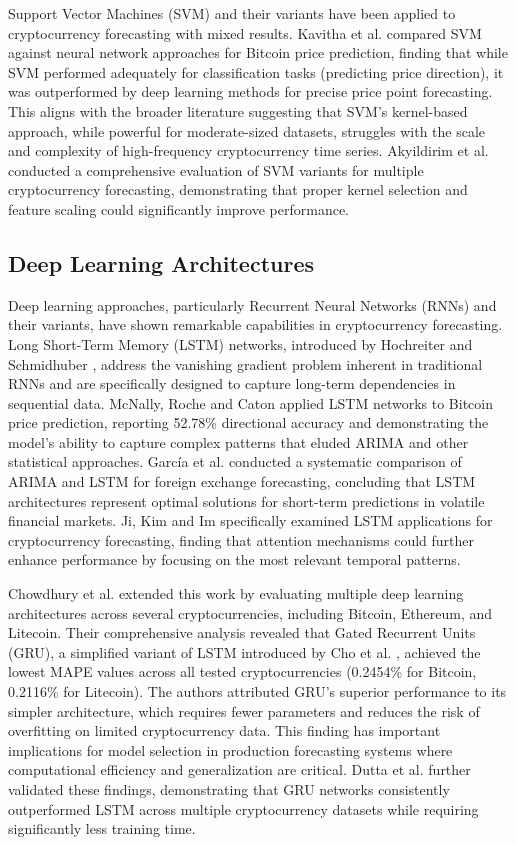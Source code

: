 \documentclass[conference]{IEEEtran}
\begin{document}
Support Vector Machines (SVM) and their variants have been applied to cryptocurrency forecasting with mixed results. Kavitha et al. \cite{kavitha2022} compared SVM against neural network approaches for Bitcoin price prediction, finding that while SVM performed adequately for classification tasks (predicting price direction), it was outperformed by deep learning methods for precise price point forecasting. This aligns with the broader literature suggesting that SVM's kernel-based approach, while powerful for moderate-sized datasets, struggles with the scale and complexity of high-frequency cryptocurrency time series. Akyildirim et al. \cite{akyildirim2021} conducted a comprehensive evaluation of SVM variants for multiple cryptocurrency forecasting, demonstrating that proper kernel selection and feature scaling could significantly improve performance.

\subsection{Deep Learning Architectures}

Deep learning approaches, particularly Recurrent Neural Networks (RNNs) and their variants, have shown remarkable capabilities in cryptocurrency forecasting. Long Short-Term Memory (LSTM) networks, introduced by Hochreiter and Schmidhuber \cite{hochreiter1997}, address the vanishing gradient problem inherent in traditional RNNs and are specifically designed to capture long-term dependencies in sequential data. McNally, Roche and Caton \cite{mcnally2018} applied LSTM networks to Bitcoin price prediction, reporting 52.78\% directional accuracy and demonstrating the model's ability to capture complex patterns that eluded ARIMA and other statistical approaches. Garc\'{i}a et al. \cite{garcia2023} conducted a systematic comparison of ARIMA and LSTM for foreign exchange forecasting, concluding that LSTM architectures represent optimal solutions for short-term predictions in volatile financial markets. Ji, Kim and Im \cite{ji2019} specifically examined LSTM applications for cryptocurrency forecasting, finding that attention mechanisms could further enhance performance by focusing on the most relevant temporal patterns.

Chowdhury et al. \cite{chowdhury2020} extended this work by evaluating multiple deep learning architectures across several cryptocurrencies, including Bitcoin, Ethereum, and Litecoin. Their comprehensive analysis revealed that Gated Recurrent Units (GRU), a simplified variant of LSTM introduced by Cho et al. \cite{cho2014}, achieved the lowest MAPE values across all tested cryptocurrencies (0.2454\% for Bitcoin, 0.2116\% for Litecoin). The authors attributed GRU's superior performance to its simpler architecture, which requires fewer parameters and reduces the risk of overfitting on limited cryptocurrency data. This finding has important implications for model selection in production forecasting systems where computational efficiency and generalization are critical. Dutta et al. \cite{dutta2020} further validated these findings, demonstrating that GRU networks consistently outperformed LSTM across multiple cryptocurrency datasets while requiring significantly less training time.
\end{document}

